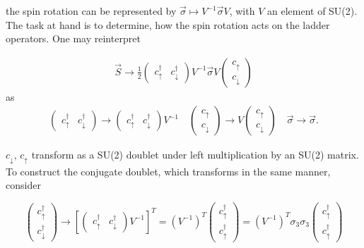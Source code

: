 \documentclass[../../../main.tex]{subfiles}
\begin{document}
the spin rotation can be represented by $\vec{\sigma} \mapsto V^{-1}\vec{\sigma}V$, with $V$ an element of SU(2). The task at hand is to determine, how the spin rotation acts on the ladder operators. One may reinterpret 

\begin{gather}
	\vec{S} \rightarrow \frac12 
\begin{pmatrix}
c_\uparrow^\dagger & c_\downarrow^\dagger
\end{pmatrix}
V^{-1}
\vec{\sigma}
V
\begin{pmatrix}
c_\uparrow \\
c_\downarrow
\end{pmatrix} 
\end{gather}
as
\begin{gather}
\begin{pmatrix}
c_\uparrow^\dagger & c_\downarrow^\dagger 
\end{pmatrix} 
\rightarrow 
\begin{pmatrix}
c_\uparrow^\dagger & c_\downarrow^\dagger 
\end{pmatrix}V^{-1} \quad 
\begin{pmatrix}
c_\uparrow \\
c_\downarrow 
\end{pmatrix} 
\rightarrow 
	V
\begin{pmatrix}
c_\uparrow \\
c_\downarrow 
\end{pmatrix} \quad
	\vec{\sigma} \rightarrow \vec{\sigma}.
\end{gather}

$c_\downarrow, \, c_\uparrow$ transform as a SU(2) doublet under left multiplication by an SU(2) matrix. To construct the conjugate doublet, which transforms in the same manner, consider 

\begin{equation}
\begin{pmatrix}
c_\uparrow^\dagger \\
c_\downarrow^\dagger
\end{pmatrix}\rightarrow 
\left[\begin{pmatrix}
c_\uparrow^\dagger & c_\downarrow^\dagger 
\end{pmatrix}V^{-1}\right]^T =
	\left(V^{-1}\right)^T 
\begin{pmatrix}
c_\uparrow^\dagger \\
c_\uparrow^\dagger 
\end{pmatrix} = 
	\left(V^{-1}\right)^T
\sigma_3 \sigma_3
\begin{pmatrix}
c_\uparrow^\dagger \\
c_\uparrow^\dagger 
\end{pmatrix}\end{equation}
\end{document}
